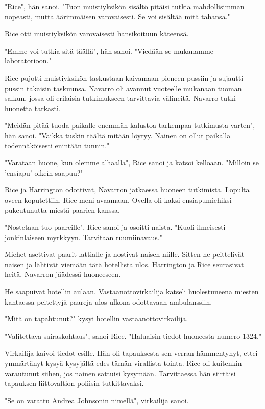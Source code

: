 "Rice", hän sanoi. "Tuon muistiyksikön sisältö pitäisi tutkia mahdollisimman nopeasti, mutta äärimmäisen varovaisesti. Se voi sisältää mitä tahansa."


Rice otti muistiyksikön varovaisesti hansikoituun käteensä.


"Emme voi tutkia sitä täällä", hän sanoi. "Viedään se mukanamme laboratorioon."


Rice pujotti muistiyksikön taskustaan kaivamaan pieneen pussiin ja sujautti pussin takaisin taskuunsa. Navarro oli avannut vuoteelle mukanaan tuoman salkun, jossa oli erilaisia tutkimukseen tarvittavia välineitä. Navarro tutki huonetta tarkasti.


"Meidän pitää tuoda paikalle enemmän kalustoa tarkempaa tutkimusta varten", hän sanoi. "Vaikka tuskin täältä mitään löytyy. Nainen on ollut paikalla todennäköisesti enintään tunnin."


"Varataan huone, kun olemme alhaalla", Rice sanoi ja katsoi kelloaan. "Milloin se 'ensiapu' oikein saapuu?"


Rice ja Harrington odottivat, Navarron jatkaessa huoneen tutkimista. Lopulta oveen koputettiin. Rice meni avaamaan. Ovella oli kaksi ensiapumiehiksi pukeutunutta miestä paarien kanssa.


"Nostetaan tuo paareille", Rice sanoi ja osoitti naista. "Kuoli ilmeisesti jonkinlaiseen myrkkyyn. Tarvitaan ruumiinavaus."


Miehet asettivat paarit lattialle ja nostivat naisen niille. Sitten he peittelivät naisen ja lähtivät viemään tätä hotellista ulos. Harrington ja Rice seurasivat heitä, Navarron jäädessä huoneeseen.




\psep He saapuivat hotellin aulaan. Vastaanottovirkailija katseli huolestuneena miesten kantaessa peitettyjä paareja ulos ulkona odottavaan ambulanssiin.


"Mitä on tapahtunut?" kysyi hotellin vastaanottovirkailija.


"Valitettava sairaskohtaus", sanoi Rice. "Haluaisin tiedot huoneesta numero 1324."


Virkailija kaivoi tiedot esille. Hän oli tapauksesta sen verran hämmentynyt, ettei ymmärtänyt kysyä kysyjältä edes tämän virallista tointa. Rice oli kuitenkin varautunut siihen, jos nainen sattuisi kysymään. Tarvittaessa hän siirtäisi tapauksen liittovaltion poliisin tutkittavaksi.


"Se on varattu Andrea Johnsonin nimellä", virkailija sanoi.


